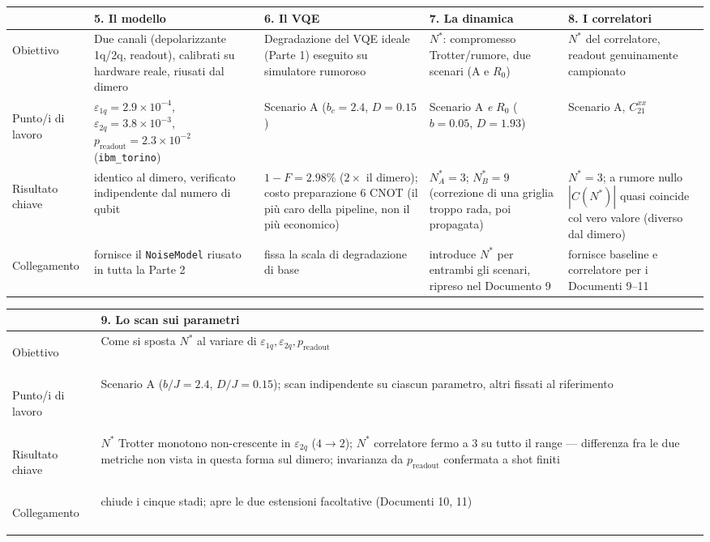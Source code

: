 \documentclass[11pt,a4paper]{article}
\begin{document}
\renewcommand{\arraystretch}{1.3}
\begin{landscape}
\thispagestyle{empty}
\begin{center}
\small
\setlength{\tabcolsep}{3.5pt}
\begin{tabular}{@{}>{\bfseries\raggedright}p{2.3cm} p{4.1cm} p{4.1cm} p{4.1cm} p{4.1cm}@{}}
\toprule
\rowcolor{grigetto}
 & \textbf{5. Il modello} & \textbf{6. Il VQE} & \textbf{7. La dinamica} & \textbf{8. I correlatori} \\
\midrule
Obiettivo &
Due canali (depolarizzante 1q/2q, readout), calibrati su hardware reale,
riusati dal dimero &
Degradazione del VQE ideale (Parte 1) eseguito su simulatore rumoroso &
$N^*$: compromesso Trotter/rumore, due scenari (A e $R_0$) &
$N^*$ del correlatore, readout genuinamente campionato \\
\addlinespace
Punto/i di lavoro &
$\varepsilon_{1q}{=}2.9{\times}10^{-4}$, $\varepsilon_{2q}{=}3.8{\times}10^{-3}$,
$p_\text{readout}{=}2.3{\times}10^{-2}$ (\texttt{ibm\_torino}) &
Scenario A ($b_c{=}2.4$, $D{=}0.15$) &
Scenario A \emph{e} $R_0$ ($b{=}0.05$, $D{=}1.93$) &
Scenario A, $C_{21}^{xx}$ \\
\addlinespace
Risultato chiave &
identico al dimero, verificato indipendente dal numero di qubit &
$1{-}F{=}2.98\%$ ($2\times$ il dimero); costo preparazione $6$ CNOT (il
più caro della pipeline, non il più economico) &
$N^*_A=3$; $N^*_B=9$ (correzione di una griglia troppo rada, poi
propagata) &
$N^*=3$; a rumore nullo $|C(N^*)|$ quasi coincide col vero valore
(diverso dal dimero) \\
\addlinespace
Collegamento &
fornisce il \texttt{NoiseModel} riusato in tutta la Parte 2 &
fissa la scala di degradazione di base &
introduce $N^*$ per entrambi gli scenari, ripreso nel Documento 9 &
fornisce baseline e correlatore per i Documenti 9--11 \\
\bottomrule
\end{tabular}

\vspace{6pt}
\begin{tabular}{@{}>{\bfseries\raggedright}p{2.3cm} p{16.9cm}@{}}
\toprule
\rowcolor{grigetto}
 & \textbf{9. Lo scan sui parametri} \\
\midrule
Obiettivo & Come si sposta $N^*$ al variare di $\varepsilon_{1q},\varepsilon_{2q},p_\text{readout}$ \\
\addlinespace
Punto/i di lavoro & Scenario A ($b/J{=}2.4$, $D/J{=}0.15$); scan indipendente su ciascun parametro, altri fissati al riferimento \\
\addlinespace
Risultato chiave & $N^*$ Trotter monotono non-crescente in $\varepsilon_{2q}$ ($4\to2$); $N^*$ correlatore fermo a $3$ su tutto il range --- differenza fra le due metriche non vista in questa forma sul dimero; invarianza da $p_\text{readout}$ confermata a shot finiti \\
\addlinespace
Collegamento & chiude i cinque stadi; apre le due estensioni facoltative (Documenti 10, 11) \\
\bottomrule
\end{tabular}
\end{center}
\end{landscape}
\end{document}

